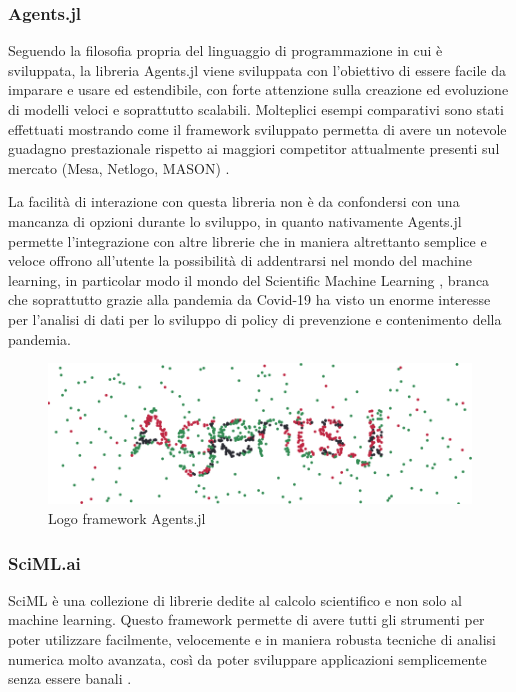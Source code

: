 \subsubsection{Agents.jl}
Seguendo la filosofia propria del linguaggio di programmazione 
in cui è sviluppata, la libreria Agents.jl \cite{Agents.jl} 
viene sviluppata con l’obiettivo di essere facile da imparare e 
usare ed estendibile, con forte attenzione sulla creazione ed 
evoluzione di modelli veloci e soprattutto scalabili. 
Molteplici esempi comparativi sono stati effettuati mostrando 
come il framework sviluppato permetta di avere un notevole 
guadagno prestazionale rispetto ai maggiori competitor 
attualmente presenti sul mercato (Mesa, Netlogo, MASON) 
\cite{ABAR201713}.

La facilità di interazione con questa libreria non è da 
confondersi con una mancanza di opzioni durante lo sviluppo, 
in quanto nativamente Agents.jl permette l’integrazione con 
altre librerie che in maniera altrettanto semplice e veloce 
offrono all’utente la possibilità 
di addentrarsi nel mondo del machine learning, in particolar 
modo il mondo del Scientific Machine Learning 
\cite{rackauckas2017differentialequations}, 
branca che soprattutto grazie alla pandemia da Covid-19 ha 
visto un enorme interesse per l’analisi di dati per lo 
sviluppo di policy di prevenzione e contenimento della 
pandemia. 

\begin{figure}[h]
    \includegraphics[width=\linewidth]{img/Agents_5poOwRo.png}
    \caption{Logo framework Agents.jl}
    \label{fig:Agents.jl_logo}
\end{figure}

\subsubsection{SciML.ai}
SciML è una collezione di librerie dedite al calcolo scientifico 
e non solo al machine learning. Questo framework permette di 
avere tutti gli strumenti per poter utilizzare facilmente, 
velocemente e in maniera robusta tecniche di analisi numerica 
molto avanzata, così da poter sviluppare applicazioni 
semplicemente senza essere banali 
\cite{rackauckas2017differentialequations} 
\cite{rackauckas2019diffeqflux} 
\cite{rackauckas2020universal}. 


